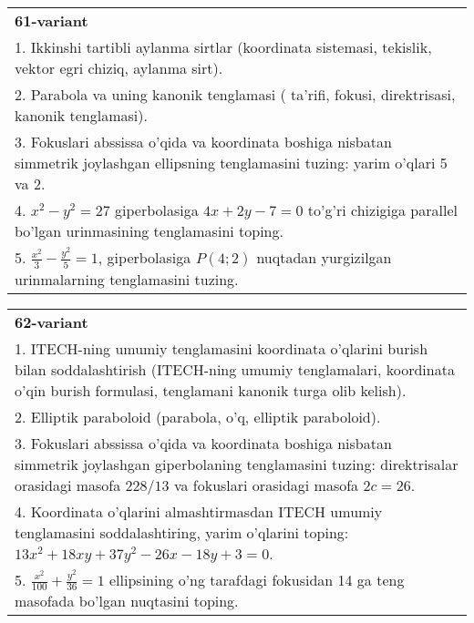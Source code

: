 \documentclass{article}
\begin{document}
\begin{tabular}{m{17cm}}
\textbf{61-variant}\\
1. Ikkinshi tartibli aylanma sirtlar (koordinata sistemasi, tekislik, vektor egri chiziq, aylanma sirt).\\

2. Parabola va uning kanonik tenglamasi ( ta'rifi, fokusi, direktrisasi, kanonik tenglamasi).\\

3. Fokuslari abssissa o'qida va koordinata boshiga nisbatan simmetrik joylashgan ellipsning tenglamasini tuzing: yarim o'qlari 5 va 2.\\

4. $x^{2} - y^{2} = 27$ giperbolasiga $4x + 2y - 7 = 0$ to'g'ri chizigiga parallel bo'lgan urinmasining tenglamasini toping.  \\

5. $\frac{x^{2}}{3} - \frac{y^{2}}{5} = 1$, giperbolasiga $P(4;2)$ nuqtadan yurgizilgan urinmalarning tenglamasini tuzing.  
\end{tabular}
\vspace{1cm}


\begin{tabular}{m{17cm}}
\textbf{62-variant}\\
1. ITECH-ning umumiy tenglamasini koordinata o'qlarini burish bilan soddalashtirish (ITECH-ning umumiy tenglamalari, koordinata o'qin burish formulasi, tenglamani kanonik turga olib kelish).\\

2. Elliptik paraboloid (parabola, o'q, elliptik paraboloid).\\

3. Fokuslari abssissa o'qida va koordinata boshiga nisbatan simmetrik joylashgan giperbolaning tenglamasini tuzing: direktrisalar orasidagi masofa $228/13$ va fokuslari orasidagi masofa $2c=26$.\\

4. Koordinata o'qlarini almashtirmasdan ITECH umumiy tenglamasini soddalashtiring, yarim o'qlarini toping: $13x^{2} + 18xy + 37y^{2} - 26x - 18y + 3 = 0$.  \\

5. $\frac{x^{2}}{100} + \frac{y^{2}}{36} = 1$ ellipsining o'ng tarafdagi fokusidan 14 ga teng masofada bo'lgan nuqtasini toping.  
\end{tabular}
\vspace{1cm}
\end{document}
